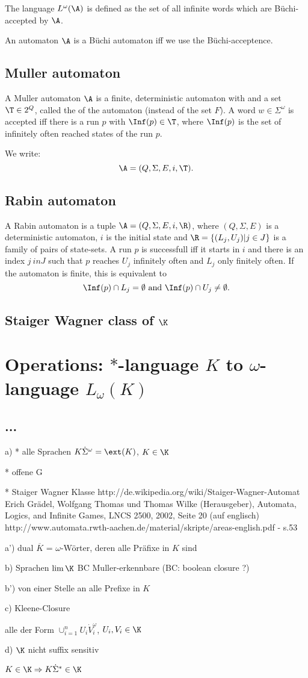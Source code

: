 The language $L^\omega(\A)$ is defined as the set of all infinite words which are Büchi-accepted by  $\A$.

An automaton $\A$ is a Büchi automaton iff we use the Büchi-acceptence.

\subsection{Muller automaton}
A Muller automaton $\A$ is a finite, deterministic automaton with  and a set $\T \in 2^Q$, called the  of the automaton (instead of the set $F$). A word $w \in \Sigma^\omega$ is accepted iff there is a run $p$ with $\Inf(p) \in \T$, where $\Inf(p)$ is the set of infinitely often reached states of the run $p$.

We write:
\[ \A = (Q, \Sigma, E, i, \T) . \]

\subsection{Rabin automaton}
A Rabin automaton is a tuple $\A = (Q, \Sigma, E, i, \R)$, where $(Q,\Sigma,E)$ is a deterministic automaton, $i$ is the initial state and $\R = \{(L_j, U_j) | j \in J\}$ is a family of pairs of state-sets. A run $p$ is successfull iff it starts in $i$ and there is an index $j \ in J$ such that $p$ reaches $U_j$ infinitely often and $L_j$ only finitely often. If the automaton is finite, this is equivalent to
\[ \Inf(p) \cap L_j = \emptyset \ \text{and} \ \Inf(p) \cap U_j \neq \emptyset . \]

\subsection{Staiger Wagner class of $\K$}

\section{Operations: $*$-language $K$ to $\omega$-language $L_\omega (K)$}
\subsection{...}
a)
* alle Sprachen $K \dot \Sigma^\omega = \ext(K)$, $K \in \K$

* offene G

* Staiger Wagner Klasse
http://de.wikipedia.org/wiki/Staiger-Wagner-Automat
Erich Grädel, Wolfgang Thomas und Thomas Wilke (Herausgeber), Automata, Logics, and Infinite Games, LNCS 2500, 2002, Seite 20 (auf englisch)
http://www.automata.rwth-aachen.de/material/skripte/areas-english.pdf - s.53

a')
dual $\overline{K}$ = $\omega$-Wörter, deren alle Präfixe in $K$ sind

b) Sprachen $\lim \K$
BC Muller-erkennbare
(BC: boolean closure ?)

b') von einer Stelle an alle Prefixe in $K$

c) Kleene-Closure

alle der Form $\cup_{i=1}^n U_i \dot V_i^\omega$, $U_i, V_i \in \K$

d) $\K$ nicht suffix sensitiv

$K \in \K \Rightarrow K \dot \Sigma^* \in \K$  
